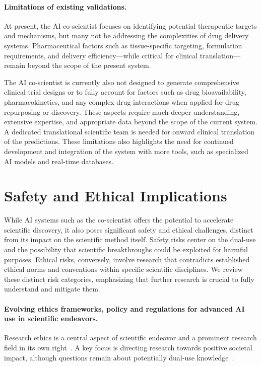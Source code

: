 \paragraph{Limitations of existing validations.} At present, the AI co-scientist focuses on identifying potential therapeutic targets and mechanisms, but many not be addressing the complexities of drug delivery systems. Pharmaceutical factors such as tissue-specific targeting, formulation requirements, and delivery efficiency—while critical for clinical translation—remain beyond the scope of the present system.

The AI co-scientist is currently also not designed to generate comprehensive clinical trial designs or to fully account for factors such as drug bioavailability, pharmacokinetics, and any complex drug interactions when applied for drug repurposing or discovery. These aspects require much deeper understanding, extensive expertise, and appropriate data beyond the scope of the current system. A dedicated translational scientific team is needed for onward clinical translation of the predictions. These limitations also highlights the need for continued development and integration of the system with more tools, such as specialized AI models and real-time databases.


\section{Safety and Ethical Implications}
\label{sec:safetyethics}
While AI systems such as the co-scientist offers the potential to accelerate scientific discovery, it also poses significant safety and ethical challenges, distinct from its impact on the scientific method itself. Safety risks center on the dual-use and the possibility that scientific breakthroughs could be exploited for harmful purposes. Ethical risks, conversely, involve research that contradicts established ethical norms and conventions within specific scientific disciplines. We review these distinct risk categories, emphasizing that further research is crucial to fully understand and mitigate them.

\paragraph{Evolving ethics frameworks, policy and regulations for advanced AI use in scientific endeavors.}
Research ethics is a central aspect of scientific endeavor and a prominent research field in its own right~\citep{shrader1994ethics, resnik2005ethics, rollin2006science, fisher2008research, edel2018science, menapace2019scientific}.  A key focus is directing research towards positive societal impact, although questions remain about potentially dual-use knowledge~\citep{miller2007ethical, selgelid2009governance, pustovit2010philosophical, forge2010note, kuhlau2013ethics}.

